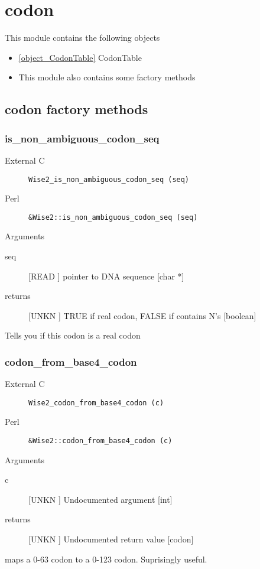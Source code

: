\section{codon}
\label{module_codon}
This module contains the following objects

\begin{itemize}
\item \ref{object_CodonTable} CodonTable

\item This module also contains some factory methods
\end{itemize}
\subsection{codon factory methods}
\subsubsection{is_non_ambiguous_codon_seq}
\begin{description}
\item[External C] {\tt Wise2_is_non_ambiguous_codon_seq (seq)}
\item[Perl] {\tt &Wise2::is_non_ambiguous_codon_seq (seq)}

\end{description}
Arguments
\begin{description}
\item[seq] [READ ] pointer to DNA sequence [char *]
\item[returns] [UNKN ] TRUE if real codon, FALSE if contains N's [boolean]
\end{description}
Tells you if this codon is a real codon


\subsubsection{codon_from_base4_codon}
\begin{description}
\item[External C] {\tt Wise2_codon_from_base4_codon (c)}
\item[Perl] {\tt &Wise2::codon_from_base4_codon (c)}

\end{description}
Arguments
\begin{description}
\item[c] [UNKN ] Undocumented argument [int]
\item[returns] [UNKN ] Undocumented return value [codon]
\end{description}
maps a 0-63 codon to a 0-123 codon. Suprisingly useful.


